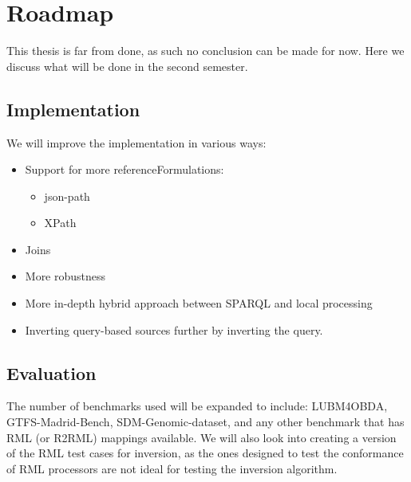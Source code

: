 \chapter{Roadmap}
\label{chapter:conclusion}
This thesis is far from done, as such no conclusion can be made for now. Here we discuss what will be done in the second semester.

\section{Implementation}
We will improve the implementation in various ways:
\begin{itemize}
    \item Support for more referenceFormulations:
    \begin{itemize}
        \item \acrshort{json}-path
        \item XPath
    \end{itemize}
    \item Joins
    \item More robustness
    \item More in-depth hybrid approach between SPARQL and local processing
    \item Inverting query-based sources further by inverting the query.
\end{itemize}

\section{Evaluation}
The number of benchmarks used will be expanded to include: LUBM4OBDA, GTFS-Madrid-Bench, SDM-Genomic-dataset, and any other benchmark that has RML (or R2RML) mappings available. We will also look into creating a version of the RML test cases for inversion, as the ones designed to test the conformance of RML processors are not ideal for testing the inversion algorithm.
